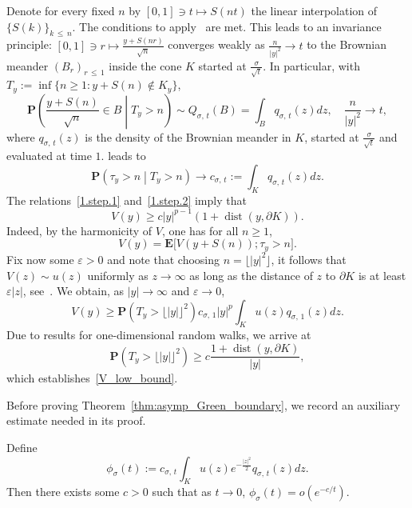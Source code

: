 \documentclass[AHL,Unicode,longabstracts,published]{cedram}
\DeclareMathOperator{\dist}{dist}
\newcommand{\pr}{\mathbf{P}}
\newcommand{\e}{\mathbf{E}}
\renewcommand{\epsilon}{\varepsilon}
\renewcommand{\le}{\leqslant}
\renewcommand{\ge}{\geqslant}
\begin{document}
Denote for every fixed $n$ by $[0,1]\ni t\mapsto S(nt)$ the linear interpolation of $\{S(k)\}_{k\,\le\,n}$. The conditions to apply~\cite[Theorem~2.3]{Du-78} are met. This leads to an invariance principle: $[0,1]\ni r\mapsto\frac{y+S(nr)}{\sqrt{n}}$ converges weakly as $\frac{n}{|y|^2}\to t$ to the Brownian meander $(B_r)_{r\,\le\,1}$ inside the cone $K$ started at $\frac{\sigma}{\sqrt{t}}$. In particular, with $T_y:=\inf\{n\ge1: y+S(n)\notin K_y\}$,
\begin{equation}\label{1.step.1}
\pr\left(\frac{y+S(n)}{\sqrt{n}}\in B\middle| T_y>n\right)\sim Q_{\sigma,\,t}(B)=\int_B q_{\sigma,\,t}(z)dz,\quad
\frac{n}{|y|^2}\to t,
\end{equation}
where $q_{\sigma,\,t}(z)$ is the density of the Brownian meander in $K$, started at $\frac{\sigma}{\sqrt{t}}$ and evaluated at time $1$. \cite[Theorem~2.3]{Du-78} leads to
\begin{equation}\label{1.step.2}
\pr\left(\tau_y>n\middle| T_y>n\right)\to c_{\sigma,\,t}:=\int_K q_{\sigma,\,t}(z)dz.
\end{equation}
The relations~\eqref{1.step.1} and~\eqref{1.step.2} imply that
\begin{equation}\label{V_low_bound}
V(y)\ge c|y|^{p-1}\left(1+\dist(y,\partial K)\right).
\end{equation}
Indeed, by the harmonicity of $V$, one has for all $n\ge1$,
\[
V(y)=\e\big[V\left(y+S(n)\right);\tau_y>n\big].
\]
Fix now some $\epsilon>0$ and note that choosing $n=\lfloor| y|^2\rfloor$, it follows that $V(z)\sim u(z)$ uniformly as $z\to\infty$ as long as the distance of $z$ to $\partial K$ is at least $\epsilon| z|$, see~\cite[Lemma~13]{DeWa-15}. We obtain, as $| y|\to\infty$ and $\epsilon\rightarrow 0$,
\[
V(y)\ge \pr\left(T_y>\lfloor|y|\rfloor^2\right)c_{\sigma,\,1}| y|^p\int_K u(z)q_{\sigma,\,1}(z)dz.
\]
Due to results for one-dimensional random walks, we arrive at
\[
\pr\left(T_y>\lfloor|y|\rfloor^2\right)\ge c\frac{1+\dist\left(y,\partial K\right)}{|y|},
\]
which establishes~\eqref{V_low_bound}.

Before proving Theorem~\ref{thm:asymp_Green_boundary}, we record an auxiliary estimate needed in its proof.

\begin{lemm}\label{thm:auxmeander}
Define
\[
\phi_\sigma(t):=c_{\sigma,\,t}\int_K u(z)e^{-\frac{| z|^2}{2}}q_{\sigma,\,t}(z)dz.
\]
Then there exists some $c>0$ such that as $t\to 0$, $\phi_\sigma(t)=o(e^{-c/t})$.
\end{lemm}
\end{document}
